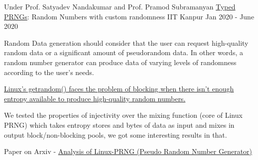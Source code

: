 \begin{cventries}



  \cventry
    {Under Prof. Satyadev Nandakumar and Prof. Pramod Subramanyan} %
    {\href{https://arxiv.org/abs/2312.03369}{Typed PRNGs}: Random Numbers with custom randomness} %
    {IIT Kanpur} %
    {Jan 2020 - June 2020} %
    {
      \begin{cvitems} %
      \item Random Data generation should consider that the user can request high-quality random data or a significant amount of pseudorandom data. In other words, a random number generator can produce data of varying levels of randomness according to the user's needs.
      \item \href{https://lwn.net/Articles/800509/}{Linux's getrandom() faces the problem of blocking when there isn't enough entropy available to produce high-quality random numbers.}
      \item We tested the properties of injectivity over the mixing function (core of Linux PRNG) which takes entropy stores and bytes of data as input and mixes in output block/non-blocking pools, we got some interesting results in that.
      \item Paper on Arxiv - \href{https://arxiv.org/abs/2312.03369}{Analysis of Linux-PRNG (Pseudo Random Number Generator)}
      \end{cvitems}
    }


\end{cventries}
